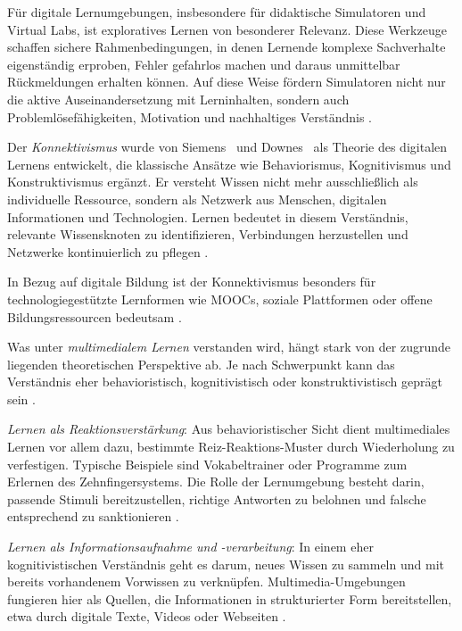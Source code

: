 Für digitale Lernumgebungen, insbesondere für didaktische Simulatoren und Virtual Labs, ist exploratives Lernen von besonderer Relevanz. Diese Werkzeuge schaffen sichere Rahmenbedingungen, in denen Lernende komplexe Sachverhalte eigenständig erproben, Fehler gefahrlos machen und daraus unmittelbar Rückmeldungen erhalten können. Auf diese Weise fördern Simulatoren nicht nur die aktive Auseinandersetzung mit Lerninhalten, sondern auch Problemlösefähigkeiten, Motivation und nachhaltiges Verständnis \parencite[S.~131]{engelhardt-nowitzki_einsatz_2006}.

Der \textit{Konnektivismus} wurde von Siemens~\cite{siemens_connectivism_2005} und Downes~\cite{downes_introduction_2008} als Theorie des digitalen Lernens entwickelt, die klassische Ansätze wie Behaviorismus, Kognitivismus und Konstruktivismus ergänzt. Er versteht Wissen nicht mehr ausschließlich als individuelle Ressource, sondern als Netzwerk aus Menschen, digitalen Informationen und Technologien. Lernen bedeutet in diesem Verständnis, relevante Wissensknoten zu identifizieren, Verbindungen herzustellen und Netzwerke kontinuierlich zu pflegen \parencite[S.~14]{abbas_theory_2015}.

In Bezug auf digitale Bildung ist der Konnektivismus besonders für technologiegestützte Lernformen wie MOOCs, soziale Plattformen oder offene Bildungsressourcen bedeutsam \parencite[S.~14]{abbas_theory_2015}.

Was unter \textit{multimedialem Lernen} verstanden wird, hängt stark von der zugrunde liegenden theoretischen Perspektive ab. Je nach Schwerpunkt kann das Verständnis eher behavioristisch, kognitivistisch oder konstruktivistisch geprägt sein \parencite[S.~64]{furstenau_lehr-lern-theorien_2019}. 

\textit{Lernen als Reaktionsverstärkung}: Aus behavioristischer Sicht dient multimediales Lernen vor allem dazu, bestimmte Reiz-Reaktions-Muster durch Wiederholung zu verfestigen. Typische Beispiele sind Vokabeltrainer oder Programme zum Erlernen des Zehnfingersystems. Die Rolle der Lernumgebung besteht darin, passende Stimuli bereitzustellen, richtige Antworten zu belohnen und falsche entsprechend zu sanktionieren \parencite[S.~64]{furstenau_lehr-lern-theorien_2019}. 

\textit{Lernen als Informationsaufnahme und -verarbeitung}: In einem eher kognitivistischen Verständnis geht es darum, neues Wissen zu sammeln und mit bereits vorhandenem Vorwissen zu verknüpfen. Multimedia-Umgebungen fungieren hier als Quellen, die Informationen in strukturierter Form bereitstellen, etwa durch digitale Texte, Videos oder Webseiten \parencite[S.~64]{furstenau_lehr-lern-theorien_2019}. 

